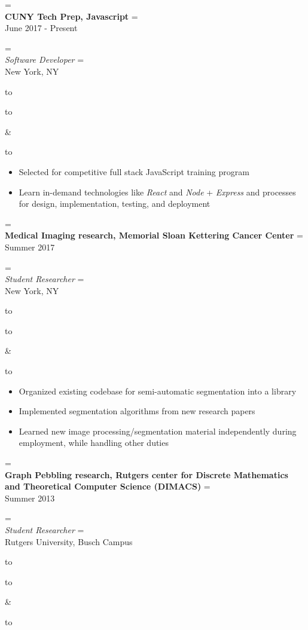 \documentclass{article}
\newcommand{\appendtotoks}[2]{%
  #1=\expandafter{\the#1#2}%
}
\def\gobble#1{}
\def\gobblefirst#1{%
  #1\expandafter\expandafter\expandafter{\expandafter\gobble\the#1}}
\newcommand{\sectionTitle}[1]{{\Large #1} \vspace{4pt}}
\newenvironment{resumesection}[1]
  {\sectionTitle{#1}}
	{\vspace{10pt}}
\newcommand{\placeStyle}[1]{\textbf{#1}}
\newcommand{\positionStyle}[1]{\textit{#1}}
\newenvironment{newplace}
  {
    \newtoks\leftToks
    \newtoks\rightToks
    \newcommand{\placerow}[2]{%
      \appendtotoks{\leftToks}{\\\placeStyle{##1}}%
      \appendtotoks{\rightToks}{\\##2}}
    \newcommand{\jobrow}[2]{%
      \appendtotoks{\leftToks}{\\\positionStyle{##1}}%
      \appendtotoks{\rightToks}{\\##2}}
    \newcommand{\plainrow}[2]{%
      \appendtotoks{\leftToks}{\\##1}%
      \appendtotoks{\rightToks}{\\##2}}
    \setlength{\tabcolsep}{0pt}%
  }
  {%
    \begin{tabu} to \linewidth [h!]{X[65,l]X[35,r]}
      \begin{tabu} to \linewidth {X}
        \gobblefirst\leftToks
        \the\leftToks
      \end{tabu}
      &
      \begin{tabu} to \linewidth {X[r]}
        \gobblefirst\rightToks
        \the\rightToks
      \end{tabu}
    \end{tabu}%
  }
\newenvironment{bullets}
	{\begin{itemize}[noitemsep, topsep=0pt]}
	{\end{itemize}}
\begin{document}
\begin{resumesection}{Experience}


\begin{newplace}
	\placerow{CUNY Tech Prep, Javascript}
				   {June 2017 - Present}
	\jobrow  {Software Developer}
					 {New York, NY}
\end{newplace}

\begin{bullets}
  \item Selected for competitive full stack JavaScript training
        program
  \item Learn in-demand technologies like \textit{React} and
        \textit{Node} + \textit{Express} and processes for design,
        implementation, testing, and deployment
\end{bullets}


\begin{newplace}
  \placerow{Medical Imaging research, Memorial Sloan Kettering Cancer
            Center}
				   {Summer 2017}
  \jobrow  {Student Researcher}
				   {New York, NY}
\end{newplace}

\begin{bullets}
  \item Organized existing codebase for semi-automatic segmentation
        into a library
  \item Implemented segmentation algorithms from new research papers
  \item Learned new image processing/segmentation material
        independently during employment, while handling other duties
\end{bullets}


\begin{newplace}
	\placerow{Graph Pebbling research, Rutgers center for Discrete
            Mathematics and Theoretical Computer Science (DIMACS)}
				   {Summer 2013}
	\jobrow  {Student Researcher}
				   {Rutgers University, Busch Campus}
\end{newplace}


\end{resumesection}
\end{document}
